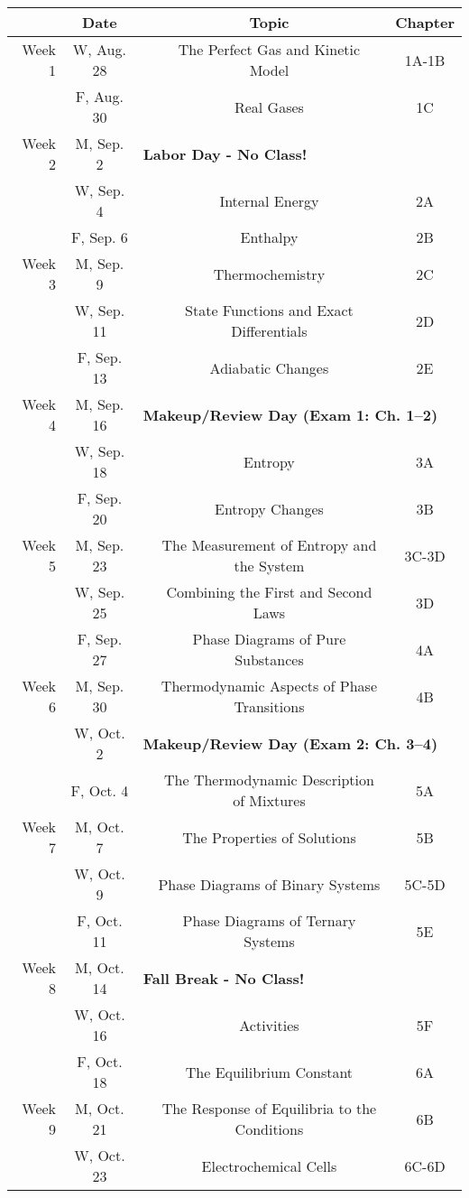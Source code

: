 \begin{tabular}{rcccc}
& Date && Topic & Chapter\\
\midrule
Week 1 & W, Aug. 28&& The Perfect Gas and Kinetic Model & 1A-1B\\
& F, Aug. 30&& Real Gases & 1C\\
\midrule
Week 2 & M, Sep. 2& \multicolumn{3}{l}{\textbf{Labor Day - No Class!}}\\
& W, Sep. 4&& Internal Energy & 2A\\
& F, Sep. 6&& Enthalpy & 2B\\
\midrule
Week 3 & M, Sep. 9&& Thermochemistry & 2C\\
& W, Sep. 11&& State Functions and Exact Differentials & 2D\\
& F, Sep. 13&& Adiabatic Changes & 2E\\
\midrule
Week 4 & M, Sep. 16& \multicolumn{3}{l}{\textbf{Makeup/Review Day (Exam 1: Ch. 1--2)}}\\
& W, Sep. 18&& Entropy & 3A\\
& F, Sep. 20&& Entropy Changes & 3B\\
\midrule
Week 5 & M, Sep. 23&& The Measurement of Entropy and the System & 3C-3D\\
& W, Sep. 25&& Combining the First and Second Laws & 3D\\
& F, Sep. 27&& Phase Diagrams of Pure Substances & 4A\\
\midrule
Week 6 & M, Sep. 30&& Thermodynamic Aspects of Phase Transitions & 4B\\
& W, Oct. 2& \multicolumn{3}{l}{\textbf{Makeup/Review Day (Exam 2: Ch. 3--4)}}\\
& F, Oct. 4&& The Thermodynamic Description of Mixtures & 5A\\
\midrule
Week 7 & M, Oct. 7&& The Properties of Solutions & 5B\\
& W, Oct. 9&& Phase Diagrams of Binary Systems & 5C-5D\\
& F, Oct. 11&& Phase Diagrams of Ternary Systems & 5E\\
\midrule
Week 8 & M, Oct. 14& \multicolumn{3}{l}{\textbf{Fall Break - No Class!}}\\
& W, Oct. 16&& Activities & 5F\\
& F, Oct. 18&& The Equilibrium Constant & 6A\\
\midrule
Week 9 & M, Oct. 21&& The Response of Equilibria to the Conditions & 6B\\
& W, Oct. 23&& Electrochemical Cells & 6C-6D\\

\end{tabular}
